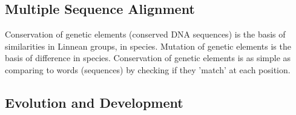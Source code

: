 \subsection{Multiple Sequence Alignment}
Conservation of genetic elements (conserved DNA sequences) is the basis of similarities in Linnean groups, in species.  Mutation of genetic elements is the basis of difference in species.  Conservation of genetic elements is as simple as comparing to words (sequences) by checking if they 'match' at each position.


 



  
\subsection{Evolution and Development}